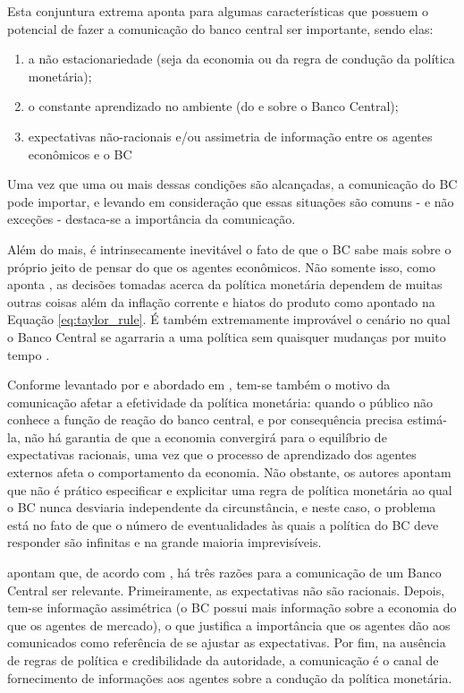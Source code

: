 Esta conjuntura extrema aponta para algumas características que possuem o potencial de fazer a comunicação do banco central ser importante, sendo elas:

\begin{enumerate}[noitemsep,nosep,labelindent=\parindent,leftmargin=*,label={\alph*}) ] 
	\item a não estacionariedade (seja da economia ou da regra de condução da política monetária);
	\item o constante aprendizado no ambiente (do e sobre o Banco Central);
	\item expectativas não-racionais e/ou assimetria de informação entre os agentes econômicos e o BC
\end{enumerate}

Uma vez que uma ou mais dessas condições são alcançadas, a comunicação do BC pode importar, e levando em consideração que essas situações são comuns - e não exceções - destaca-se a importância da comunicação. 

Além do mais, é intrinsecamente inevitável o fato de que o BC sabe mais sobre o próprio jeito de pensar do que os agentes econômicos. Não somente isso, como aponta , as decisões tomadas acerca da política monetária dependem de muitas outras coisas além da inflação corrente e hiatos do produto como apontado na Equação \eqref{eq:taylor_rule}. É também extremamente improvável o cenário no qual o Banco Central se agarraria a uma política sem quaisquer mudanças por muito tempo \cite{blinder2008central}.

Conforme levantado por  e abordado em , tem-se também o motivo da comunicação afetar a efetividade da política monetária: quando o público não conhece a função de reação do banco central, e por consequência precisa estimá-la, não há garantia de que a economia convergirá para o equilíbrio de expectativas racionais, uma vez que o processo de aprendizado dos agentes externos afeta o comportamento da economia. Não obstante, os autores apontam que não é prático especificar e explicitar uma regra de política monetária ao qual o BC nunca desviaria independente da circunstância, e neste caso, o problema está no fato de que o número de eventualidades às quais a política do BC deve responder são infinitas e na grande maioria imprevisíveis.

 apontam que, de acordo com , há três razões para a comunicação de um Banco Central ser relevante. Primeiramente, as expectativas não são racionais. Depois, tem-se informação assimétrica (o BC possui mais informação sobre a economia do que os agentes de mercado), o que justifica a importância que os agentes dão aos comunicados como referência de se ajustar as expectativas. Por fim, na ausência de regras de política e credibilidade da autoridade, a comunicação é o canal de fornecimento de informações aos agentes sobre a condução da política monetária.

